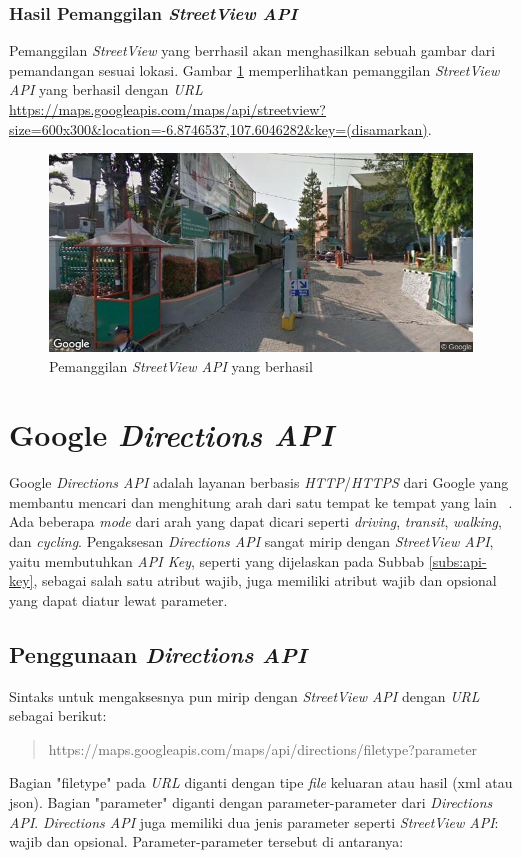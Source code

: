 \subsubsection{Hasil Pemanggilan \textit{StreetView API}}
Pemanggilan \textit{StreetView} yang berrhasil akan menghasilkan sebuah gambar dari pemandangan sesuai lokasi. Gambar \ref{fig:success-streetview} memperlihatkan pemanggilan \textit{StreetView API} yang berhasil dengan \textit{URL} \url{https://maps.googleapis.com/maps/api/streetview?size=600x300\&location=-6.8746537,107.6046282\&key=(disamarkan)}.
\begin{figure}[h]
		\includegraphics[scale=0.8]{Gambar/streetview90.png}
	\caption{Pemanggilan \textit{StreetView API} yang berhasil}
	\label{fig:success-streetview}
\end{figure}

\section{Google {\it Directions API}}
\label{sec:directions}
Google {\it Directions API} adalah layanan berbasis \textit{HTTP}/\textit{HTTPS} dari Google yang membantu mencari dan menghitung arah dari satu tempat ke tempat yang lain ~\cite{directions-api}. Ada beberapa \textit{mode} dari arah yang dapat dicari seperti {\it driving}, {\it transit}, {\it walking}, dan {\it cycling}. Pengaksesan \textit{Directions API} sangat mirip dengan {\it StreetView API}, yaitu membutuhkan \textit{API Key}, seperti yang dijelaskan pada Subbab \ref{subs:api-key}, sebagai salah satu atribut wajib, juga memiliki atribut wajib dan opsional yang dapat diatur lewat parameter. 

\subsection{Penggunaan {\it Directions API}}
Sintaks untuk mengaksesnya pun mirip dengan \textit{StreetView API} dengan \textit{URL} sebagai berikut:
\begin{quote}
https://maps.googleapis.com/maps/api/directions/filetype?parameter
\end{quote}
Bagian "filetype" pada \textit{URL} diganti dengan tipe \textit{file} keluaran atau hasil (xml atau json). Bagian "parameter" diganti dengan parameter-parameter dari {\it Directions API}.  {\it Directions API} juga memiliki dua jenis parameter seperti {\it StreetView API}: wajib dan opsional. Parameter-parameter tersebut di antaranya:

